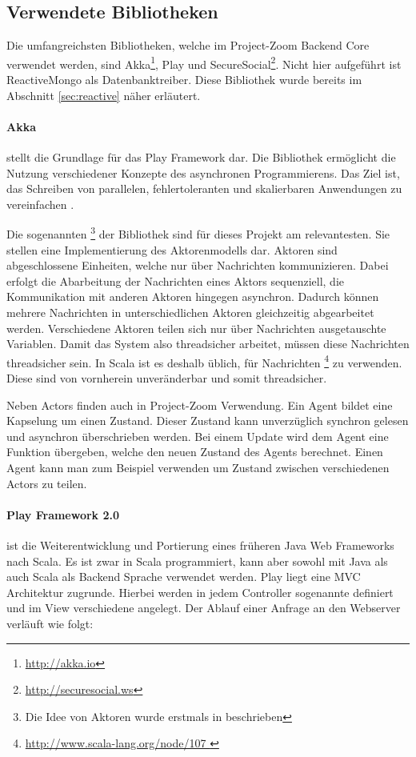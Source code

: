\subsection{Verwendete Bibliotheken}
Die umfangreichsten Bibliotheken, welche im Project-Zoom Backend Core verwendet werden, sind Akka\footnote{\url{http://akka.io}}, Play und SecureSocial\footnote{\url{http://securesocial.ws}}. Nicht hier aufgeführt ist ReactiveMongo als Datenbanktreiber. Diese Bibliothek wurde bereits im Abschnitt \ref{sec:reactive} näher erläutert. 

\paragraph{Akka}\label{sec:actor} stellt die Grundlage für das Play Framework dar. Die Bibliothek ermöglicht die Nutzung verschiedener Konzepte des asynchronen Programmierens. Das Ziel ist, das Schreiben von parallelen, fehlertoleranten und skalierbaren Anwendungen zu vereinfachen \cite{what-is-akka}. 

Die sogenannten \footnote{Die Idee von Aktoren wurde erstmals in \cite{actors} beschrieben} der Bibliothek sind für dieses Projekt am relevantesten. Sie stellen eine Implementierung des Aktorenmodells dar. Aktoren sind abgeschlossene Einheiten, welche nur über Nachrichten kommunizieren. Dabei erfolgt die Abarbeitung der Nachrichten eines Aktors sequenziell, die Kommunikation mit anderen Aktoren hingegen asynchron. Dadurch können mehrere Nachrichten in unterschiedlichen Aktoren gleichzeitig abgearbeitet werden. Verschiedene Aktoren teilen sich nur über Nachrichten ausgetauschte Variablen. Damit das System also threadsicher arbeitet, müssen diese Nachrichten threadsicher sein. In Scala ist es deshalb üblich, für Nachrichten \footnote{\url{ http://www.scala-lang.org/node/107 }} zu verwenden. Diese sind von vornherein unveränderbar und somit threadsicher.

Neben Actors finden auch  in Project-Zoom Verwendung. Ein Agent bildet eine Kapselung um einen Zustand. Dieser Zustand kann unverzüglich synchron gelesen und asynchron überschrieben werden. Bei einem Update wird dem Agent eine Funktion übergeben, welche den neuen Zustand des Agents berechnet. Einen Agent kann man zum Beispiel verwenden um Zustand zwischen verschiedenen Actors zu teilen.

\paragraph{Play Framework 2.0} ist die Weiterentwicklung  und Portierung eines früheren Java Web Frameworks nach Scala. Es ist zwar in Scala programmiert, kann aber sowohl mit Java als auch Scala als Backend Sprache verwendet werden. Play liegt eine MVC Architektur zugrunde. Hierbei werden in jedem Controller sogenannte  definiert und im View verschiedene  angelegt. Der Ablauf einer Anfrage an den Webserver verläuft wie folgt:

